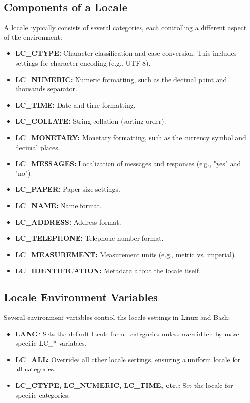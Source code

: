 \documentclass{report}
\begin{document}
\subsection{Components of a Locale}
\bigbreak \noindent 
A locale typically consists of several categories, each controlling a different aspect of the environment:
\begin{itemize}
    \item \textbf{LC\_CTYPE:} Character classification and case conversion. This includes settings for character encoding (e.g., UTF-8).
    \item \textbf{LC\_NUMERIC:} Numeric formatting, such as the decimal point and thousands separator.
    \item \textbf{LC\_TIME:} Date and time formatting.
    \item \textbf{LC\_COLLATE:} String collation (sorting order).
    \item \textbf{LC\_MONETARY:} Monetary formatting, such as the currency symbol and decimal places.
    \item \textbf{LC\_MESSAGES:} Localization of messages and responses (e.g., "yes" and "no").
    \item \textbf{LC\_PAPER:} Paper size settings.
    \item \textbf{LC\_NAME:} Name format.
    \item \textbf{LC\_ADDRESS:} Address format.
    \item \textbf{LC\_TELEPHONE:} Telephone number format.
    \item \textbf{LC\_MEASUREMENT:} Measurement units (e.g., metric vs. imperial).
    \item \textbf{LC\_IDENTIFICATION:} Metadata about the locale itself.

\end{itemize}

\bigbreak \noindent 
\subsection{Locale Environment Variables}
\bigbreak \noindent 
Several environment variables control the locale settings in Linux and Bash:
\begin{itemize}
    \item \textbf{LANG:} Sets the default locale for all categories unless overridden by more specific LC\_* variables.
    \item \textbf{LC\_ALL:} Overrides all other locale settings, ensuring a uniform locale for all categories.
    \item \textbf{LC\_CTYPE, LC\_NUMERIC, LC\_TIME, etc.:} Set the locale for specific categories.
\end{itemize}
\end{document}
